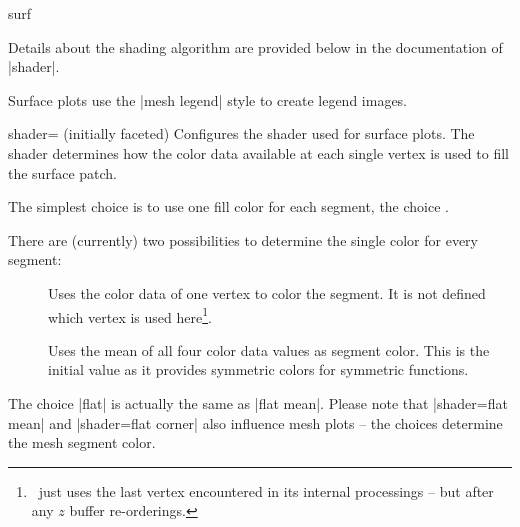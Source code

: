 {\begin{plottype}[/pgfplots]{surf}
\pgfplotsexpensiveexample
\begin{codeexample}[]
\end{codeexample}

	Details about the shading algorithm are provided below in the documentation of |shader|.

	Surface plots use the |mesh legend| style to create legend images.
\end{plottype}

\begin{pgfplotskey}{shader= (initially faceted)}
	Configures the shader used for surface plots. The shader determines how the color data available at each single vertex is used to fill the surface patch.

	The simplest choice is to use one fill color for each segment, the choice .

\pgfplotsexpensiveexample
\begin{codeexample}[]
\end{codeexample}

	\noindent There are (currently) two possibilities to determine the single color for every segment:
	\begin{description}
		\item[] Uses the color data of one vertex to color the segment. It is not defined which vertex is used here\footnote{\PGFPlots\ just uses the last vertex encountered in its internal processings -- but after any $z$ buffer re-orderings.}.

		\item[] Uses the mean of all four color data values as segment color. This is the initial value as it provides symmetric colors for symmetric functions.
	\end{description}
	The choice |flat| is actually the same as |flat mean|. Please note that |shader=flat mean| and |shader=flat corner| also influence mesh plots -- the choices determine the mesh segment color.


\end{pgfplotskey}}
